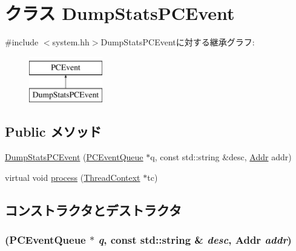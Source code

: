 \hypertarget{classDumpStatsPCEvent}{
\section{クラス DumpStatsPCEvent}
\label{classDumpStatsPCEvent}
}


{\ttfamily \#include $<$system.hh$>$}DumpStatsPCEventに対する継承グラフ:\begin{figure}[H]
\begin{center}
\leavevmode
\includegraphics[height=2cm]{classDumpStatsPCEvent}
\end{center}
\end{figure}
\subsection*{Public メソッド}
\begin{DoxyCompactItemize}
\item 
\hyperlink{classDumpStatsPCEvent_ac3b9004595de5e834fb242f2ebf60a75}{DumpStatsPCEvent} (\hyperlink{classPCEventQueue}{PCEventQueue} $\ast$q, const std::string \&desc, \hyperlink{base_2types_8hh_af1bb03d6a4ee096394a6749f0a169232}{Addr} addr)
\item 
virtual void \hyperlink{classDumpStatsPCEvent_ad66a9d5ec7cfe597b848a17c0df5cc28}{process} (\hyperlink{classThreadContext}{ThreadContext} $\ast$tc)
\end{DoxyCompactItemize}


\subsection{コンストラクタとデストラクタ}
\hypertarget{classDumpStatsPCEvent_ac3b9004595de5e834fb242f2ebf60a75}{
\subsubsection[{DumpStatsPCEvent}]{ ({\bf PCEventQueue} $\ast$ {\em q}, \/  const std::string \& {\em desc}, \/  {\bf Addr} {\em addr})}}
\label{classDumpStatsPCEvent_ac3b9004595de5e834fb242f2ebf60a75}



